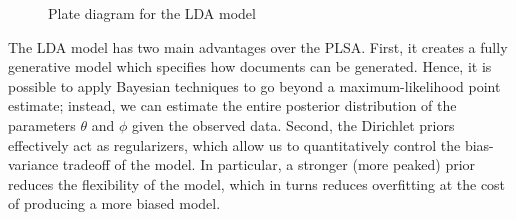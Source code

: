 \documentclass{article}
\begin{document}
\begin{figure}[htb]
%
\centering
{}
%
\caption{Plate diagram for the LDA model}
\label{fig:plate-lda}
\end{figure}

The LDA model has two main advantages over the PLSA.
First, it creates a fully generative model which specifies how documents can be generated.
Hence, it is possible to apply Bayesian techniques to go beyond a maximum-likelihood point estimate; instead, we can estimate the entire posterior distribution of the parameters $\theta$ and $\phi$ given the observed data.
Second, the Dirichlet priors effectively act as regularizers, which allow us to quantitatively control the bias-variance tradeoff of the model.
In particular, a stronger (more peaked) prior reduces the flexibility of the model, which in turns reduces overfitting at the cost of producing a more biased model.
\end{document}

